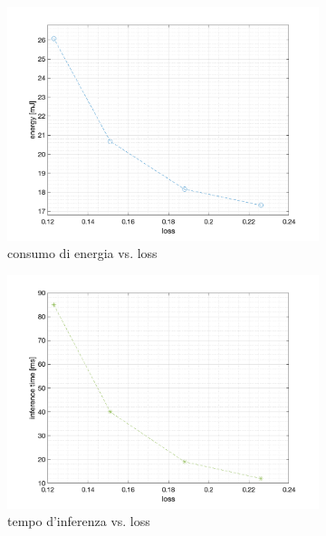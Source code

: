 \begin{figure}[!htb]
    \centering
    \begin{subfigure}{.45\textwidth}
        \includegraphics[width=\textwidth]{figure/lstm_energy_loss.png}
        \caption{consumo di energia vs. loss}
        \label{fig:performance-lstm-hexi:lstm-energy-loss}
    \end{subfigure}
    \begin{subfigure}{.45\textwidth}
        \includegraphics[width=\textwidth]{figure/lstm_time_loss.png}
        \caption{tempo d'inferenza vs. loss}
        \label{fig:performance-lstm-hexi:lstm-time-loss}
    \end{subfigure}
    \begin{subfigure}{.45\textwidth}

\end{subfigure}
\end{figure}
